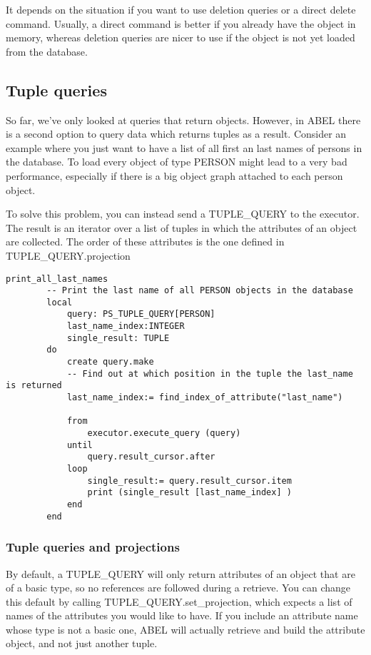 It depends on the situation if you want to use deletion queries or a direct delete command. 
Usually, a direct command is better if you already have the object in memory, whereas deletion queries are nicer to use if the object is not yet loaded from the database.

\subsection{Tuple queries}

So far, we've only looked at queries that return objects. However, in ABEL there is a second option to query data which returns tuples as a result.
Consider an example where you just want to have a list of all first an last names of persons in the database. 
To load every object of type PERSON might lead to a very bad performance, especially if there is a big object graph attached to each person object.

To solve this problem, you can instead send a TUPLE\_QUERY to the executor. 
The result is an iterator over a list of tuples in which the attributes of an object are collected. The order of these attributes is the one defined in TUPLE\_QUERY.projection

\begin{lstlisting}[language=OOSC2Eiffel, captionpos=b, caption={}, label={lst:tuple_query_simple}]
	print_all_last_names
		-- Print the last name of all PERSON objects in the database
		local
			query: PS_TUPLE_QUERY[PERSON]
			last_name_index:INTEGER
			single_result: TUPLE
		do
			create query.make
			-- Find out at which position in the tuple the last_name is returned
			last_name_index:= find_index_of_attribute("last_name")

			from
				executor.execute_query (query)
			until
				query.result_cursor.after
			loop
				single_result:= query.result_cursor.item
				print (single_result [last_name_index] )
			end			
		end
\end{lstlisting}

\subsubsection{Tuple queries and projections}
By default, a TUPLE\_QUERY will only return attributes of an object that are of a basic type, so no references are followed during a retrieve.
You can change this default by calling TUPLE\_QUERY.set\_projection, which expects a list of names of the attributes you would like to have.
If you include an attribute name whose type is not a basic one, ABEL will actually retrieve and build the attribute object, and not just another tuple.

